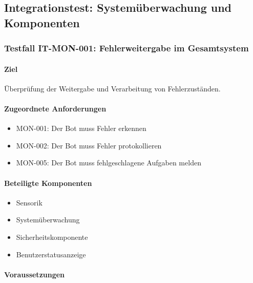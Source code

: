 \documentclass[
  a4paper,
  12pt,
  DIV=12,        %
  parskip=half,  %
  headings=small %
]{scrartcl}
\theoremstyle{definition}
\providecommand{\tightlist}{%
  \setlength{\itemsep}{0pt}\setlength{\parskip}{0pt}}
\theoremstyle{definition}
\begin{document}
\subsection{Integrationstest: Systemüberwachung und
Komponenten}\label{integrationstest-systemuxfcberwachung-und-komponenten}

\subsubsection{Testfall IT-MON-001: Fehlerweitergabe im
Gesamtsystem}\label{testfall-it-mon-001-fehlerweitergabe-im-gesamtsystem}

\paragraph{Ziel}\label{ziel-14}

Überprüfung der Weitergabe und Verarbeitung von Fehlerzuständen.

\paragraph{Zugeordnete
Anforderungen}\label{zugeordnete-anforderungen-14}

\begin{itemize}
\tightlist
\item
  MON-001: Der Bot muss Fehler erkennen
\item
  MON-002: Der Bot muss Fehler protokollieren
\item
  MON-005: Der Bot muss fehlgeschlagene Aufgaben melden
\end{itemize}

\paragraph{Beteiligte Komponenten}\label{beteiligte-komponenten-5}

\begin{itemize}
\tightlist
\item
  Sensorik
\item
  Systemüberwachung
\item
  Sicherheitskomponente
\item
  Benutzerstatusanzeige
\end{itemize}

\paragraph{Voraussetzungen}\label{voraussetzungen-14}
\end{document}
